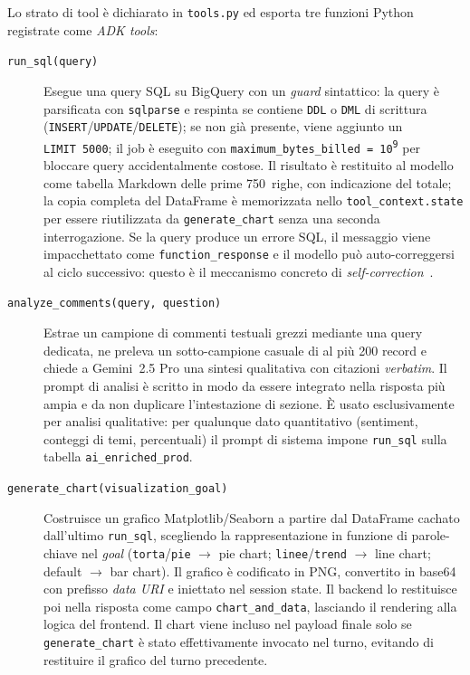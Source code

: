 Lo strato di tool è dichiarato in \texttt{tools.py} ed esporta tre
funzioni Python registrate come \emph{ADK tools}:

\begin{description}
  \item[\texttt{run\_sql(query)}]
    Esegue una query SQL su BigQuery con un \emph{guard} sintattico: la
    query è parsificata con \texttt{sqlparse} e respinta se contiene
    \texttt{DDL} o \texttt{DML} di scrittura
    (\texttt{INSERT}/\texttt{UPDATE}/\texttt{DELETE}); se non già
    presente, viene aggiunto un \texttt{LIMIT~5000}; il job è eseguito
    con \texttt{maximum\_bytes\_billed = 10\textsuperscript{9}} per
    bloccare query accidentalmente costose. Il risultato è restituito
    al modello come tabella Markdown delle prime 750~righe, con
    indicazione del totale; la copia completa del DataFrame è
    memorizzata nello \texttt{tool\_context.state} per essere
    riutilizzata da \texttt{generate\_chart} senza una seconda
    interrogazione. Se la query produce un errore SQL, il messaggio
    viene impacchettato come \texttt{function\_response} e il modello
    può auto-correggersi al ciclo successivo: questo è il meccanismo
    concreto di \emph{self-correction}~\cite{pourreza2023dinsql}.
  \item[\texttt{analyze\_comments(query, question)}]
    Estrae un campione di commenti testuali grezzi mediante una query
    dedicata, ne preleva un sotto-campione casuale di al più 200 record
    e chiede a Gemini~2.5 Pro una sintesi qualitativa con citazioni
    \emph{verbatim}. Il prompt di analisi è scritto in modo da essere
    integrato nella risposta più ampia e da non duplicare l'intestazione
    di sezione. È usato esclusivamente per analisi qualitative: per
    qualunque dato quantitativo (sentiment, conteggi di temi, percentuali)
    il prompt di sistema impone \texttt{run\_sql} sulla tabella
    \texttt{ai\_enriched\_prod}.
  \item[\texttt{generate\_chart(visualization\_goal)}]
    Costruisce un grafico Matplotlib/Seaborn a partire dal DataFrame
    cachato dall'ultimo \texttt{run\_sql}, scegliendo la rappresentazione
    in funzione di parole-chiave nel \emph{goal}
    (\texttt{torta}/\texttt{pie} $\rightarrow$ pie chart;
    \texttt{linee}/\texttt{trend} $\rightarrow$ line chart; default
    $\rightarrow$ bar chart). Il grafico è codificato in PNG, convertito
    in base64 con prefisso \emph{data URI} e iniettato nel session state.
    Il backend lo restituisce poi nella risposta come campo
    \texttt{chart\_and\_data}, lasciando il rendering alla logica del
    frontend. Il chart viene incluso nel payload finale solo se
    \texttt{generate\_chart} è stato effettivamente invocato nel turno,
    evitando di restituire il grafico del turno precedente.
\end{description}

